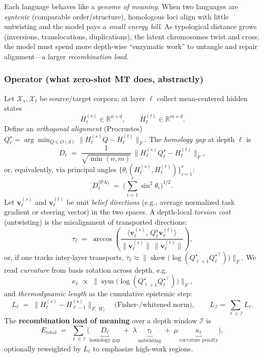 \begin{tcolorbox}[colback=black!3,colframe=black!40,title=\textbf{Plain-language summary}]
Each language behaves like a \emph{genome of meaning}. When two languages are \emph{syntenic} (comparable order/structure), homologous loci align with little untwisting and the model pays a \emph{small energy bill}. As typological distance grows (inversions, translocations, duplications), the latent chromosomes twist and cross; the model must spend more depth-wise ``enzymatic work'' to untangle and repair alignment---a larger \emph{recombination load}.
\end{tcolorbox}

\subsubsection*{Operator (what zero-shot MT does, abstractly)}
Let $\mathcal{X}_s,\mathcal{X}_t$ be source/target corpora; at layer $\ell$ collect mean-centered hidden states
\[
H_\ell^{(s)} \in \mathbb R^{n\times d},\qquad H_\ell^{(t)} \in \mathbb R^{m\times d}.
\]
Define an \emph{orthogonal alignment} (Procrustes) $Q_\ell^\star \!=\!\arg\min_{Q\in O(d)}\|H_\ell^{(s)}Q-H_\ell^{(t)}\|_F$. The \emph{homology gap} at depth $\ell$ is
\[
D_\ell \;=\; \frac{1}{\sqrt{\min(n,m)}}\,\big\|H_\ell^{(s)}Q_\ell^\star-H_\ell^{(t)}\big\|_F,
\]
or, equivalently, via principal angles $\{\theta_i(H_\ell^{(s)},H_\ell^{(t)})\}_{i=1}^r$:
\[
D_\ell^{\text{(PA)}} \;=\;\Big(\sum_{i=1}^r \sin^2\theta_i\Big)^{\!1/2}.
\]
Let $\mathbf v_\ell^{(s)}$ and $\mathbf v_\ell^{(t)}$ be unit \emph{belief directions} (e.g., average normalized task gradient or steering vector) in the two spaces. A depth-local \emph{torsion cost} (untwisting) is the misalignment of transported directions:
\[
\tau_\ell \;=\; \arccos\!\left(\frac{\big\langle \mathbf v_\ell^{(s)},\, Q_\ell^\star \mathbf v_\ell^{(t)}\big\rangle}{\|\mathbf v_\ell^{(s)}\|\,\|\mathbf v_\ell^{(t)}\|}\right),
\]
or, if one tracks inter-layer transports, $\tau_\ell \approx \big\|\operatorname{skew}\big(\log(Q_{\ell+1}^\star Q_\ell^{\star\top})\big)\big\|_F$.
We read \emph{curvature} from basis rotation across depth, e.g.
\[
\kappa_\ell \;\propto\; \big\|\operatorname{sym}\big(\log(Q_{\ell+1}^\star Q_\ell^{\star\top})\big)\big\|_F,
\]
and \emph{thermodynamic length} as the cumulative epistemic step:
\[
L_\ell \;=\; \big\|H_\ell^{(s)}-H_{\ell-1}^{(s)}\big\|_{F,\;W_\ell} \quad \text{(Fisher-/whitened norm)},\qquad L_{\mathcal I}=\sum_{\ell\in\mathcal I} L_\ell.
\]
The \textbf{recombination load of meaning} over a depth window $\mathcal I$ is
\[
E_{\text{total}} \;=\; \sum_{\ell\in\mathcal I}\!\Big(\underbrace{D_\ell}_{\text{homology gap}} \;+\; \lambda\,\underbrace{\tau_\ell}_{\text{untwisting}} \;+\; \mu\,\underbrace{\kappa_\ell}_{\text{curvature penalty}}\Big),
\]
optionally reweighted by $L_\ell$ to emphasize high-work regions.

